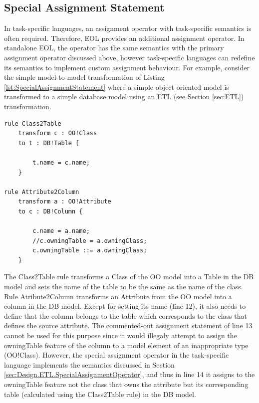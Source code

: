 \subsection{Special Assignment Statement}
\label{sec:Design.EOL.SpecialAssignmentStatement}
In task-specific languages, an assignment operator with task-specific semantics is often required. Therefore, EOL provides an additional assignment operator. In standalone EOL, the operator has the same semantics with the primary assignment operator discussed above, however task-specific languages can redefine its semantics to implement custom
assignment behaviour. For example, consider the simple model-to-model transformation of Listing \ref{lst:SpecialAssignmentStatement} where a simple object oriented model is transformed to a simple database model using an ETL (see Section \ref{sec:ETL}) transformation.

\begin{lstlisting}[float=h, caption=A simple model-to-model transformation
demonstrating the special assignment statement, label=lst:SpecialAssignmentStatement, language=ETL]
rule Class2Table
    transform c : OO!Class
    to t : DB!Table {
    
        t.name = c.name;
    }

rule Attribute2Column
    transform a : OO!Attribute
    to c : DB!Column {
    
        c.name = a.name;
        //c.owningTable = a.owningClass;
        c.owningTable ::= a.owningClass;
    }

\end{lstlisting}


The Class2Table rule transforms a Class of the OO model into a Table in the DB model and sets the name of the table to be the same as the name of the class. Rule Atribute2Column transforms an Attribute from the OO model into a column in the DB model. Except for setting its name (line 12), it also needs to define that the column belongs to the table which corresponds to the class that defines the source attribute. The commented-out assignment statement of line 13 cannot be used for this purpose since it would illegaly attempt to assign the owningTable feature of the column to a model element of an inappropriate type (OO!Class). However, the special assignment operator in the task-specific language implements the semantics discussed in Section \ref{sec:Design.ETL.SpecialAssignmentOperator}, and thus in line 14 it assigns to the owningTable feature not the class that owns the attribute but its corresponding table (calculated using the Class2Table rule) in the DB model. 



